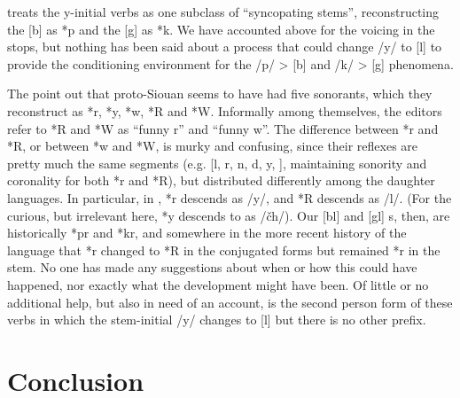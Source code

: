 \documentclass[output=paper]{LSP/langsci}
\begin{document}
\citet{Koontz1991} treats the y-initial verbs as one subclass of ``syncopating stems'', reconstructing the [b] as *p and the [g] as *k. We have accounted above for the voicing in the stops, but nothing has been said about a process that could change /y/ to [l] to provide the conditioning environment for the /p/ > [b] and /k/ > [g] phenomena.

The \textit{} \citep{RankinEtAl1998,Rankinetal2015AccessSeptember} point out that proto-Siouan seems to have had five sonorants, which they reconstruct as *r, *y, *w, *R and *W. Informally among themselves, the  editors refer to *R and *W as ``funny r'' and ``funny w''. The difference between *r and *R, or between *w and *W, is murky and confusing, since their reflexes are pretty much the same segments (e.g. [l, r, n, d, y, ], maintaining sonority and coronality for both *r and *R), but distributed differently among the daughter languages. In particular, in , *r descends as /y/, and *R descends as /l/. (For the curious, but irrelevant here, *y descends to  as /\v{c}h/). Our [bl] and [gl] s, then, are historically *pr and *kr, and somewhere in the more recent history of the language that *r changed to *R in the conjugated forms but remained *r in the stem. No one has made any suggestions about when or how this could have happened, nor exactly what the development might have been. Of little or no additional help, but also in need of an account, is the second person form of these verbs in which the stem-initial /y/ changes to [l] but there is no other prefix.

\section{Conclusion}
\end{document}
